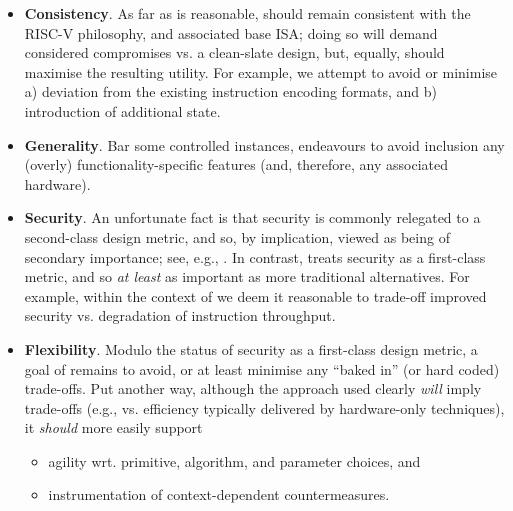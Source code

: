 \begin{itemize}
      \begin{itemize}
      \item {\bf      Consistency}.
            As far as is reasonable, \XCID should remain consistent with the
            RISC-V philosophy, and associated base ISA; doing so will demand 
            considered compromises vs. a clean-slate design, but, equally,
            should maximise the resulting utility.
            For example,
            we attempt to avoid or minimise 
            a) deviation from the existing instruction encoding formats,
               and 
            b) introduction of additional state.
      \item {\bf       Generality}.
            Bar some controlled instances, \XCID endeavours to avoid inclusion
            any (overly) functionality-specific features (and, therefore, any
            associated hardware).  
      \item {\bf         Security}.
            An unfortunate fact is that security is commonly relegated to a 
            second-class design metric, and so, by implication, viewed as 
            being of secondary importance;
            see, e.g., \cite{SCARV:Lee:03,SCARV:RKLMR:03,SCARV:RRKH:04,SCARV:BurMutTiw:16}.
            In contrast, \XCID treats security as a first-class metric, and
            so {\em at least} as important as more traditional alternatives.
            For example,
            within the context of \XCID we deem it reasonable to trade-off 
            improved security vs. degradation of instruction throughput.
      \item {\bf      Flexibility}. 
            Modulo the status of security as a first-class design metric, a
            goal of \XCID remains to avoid, or at least minimise any ``baked 
            in'' (or hard coded) trade-offs.  Put another way, although the 
            approach used clearly {\em will} imply trade-offs 
            (e.g., vs. efficiency typically delivered by hardware-only techniques), 
            it {\em should} more easily support

            \begin{itemize}
            \item agility wrt. primitive, algorithm, and parameter choices,
                  and
            \item instrumentation of context-dependent countermeasures.
            \end{itemize}


\end{itemize}
\end{itemize}
